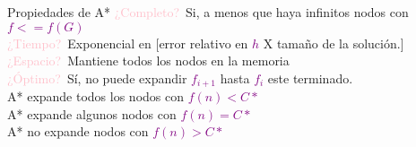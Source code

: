 \begin{frame}{Propiedades de A*}
    \textcolor{Pink}{¿Completo?}\, Si, a menos que haya infinitos nodos con \textcolor{Purple}{$f <= f(G)$}
    \\
    \textcolor{Pink}{¿Tiempo?}\, Exponencial en [error relativo en \textcolor{Purple}{$h$} X tamaño de la solución.]\\
    \textcolor{Pink}{¿Espacio?}\, Mantiene todos los nodos en la memoria\\
    \textcolor{Pink}{¿Óptimo?}\, Sí, no puede expandir
    \textcolor{Purple}{$f_{i+1}$} hasta \textcolor{Purple}{$f_{i}$} este terminado.\\
    A* expande todos los nodos con \textcolor{Purple}{$f(n) < C*$}\\
    A* expande algunos nodos con \textcolor{Purple}{$f(n) = C*$}\\
    A* no expande nodos con \textcolor{Purple}{$f(n) > C*$}
\end{frame}
